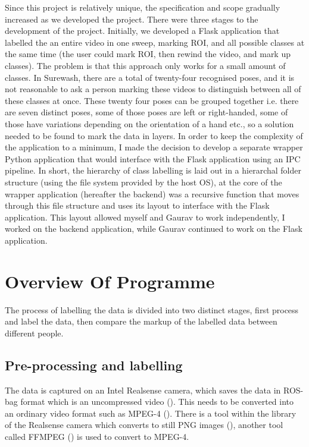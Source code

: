 Since this project is relatively unique, the specification and scope gradually increased as we developed the project. There were three stages to the development of the project. Initially, we developed a Flask application that labelled the an entire video in one sweep, marking ROI, and all possible classes at the same time (the user could mark ROI, then rewind the video, and mark up classes). The problem is that this approach only works for a small amount of classes. In Surewash, there are a total of twenty-four recognised poses, and it is not reasonable to ask a person marking these videos to distinguish between all of these classes at once. These twenty four poses can be grouped together i.e. there are seven distinct poses, some of those poses are left or right-handed, some of those have variations depending on the orientation of a hand etc., so a solution needed to be found to mark the data in layers. In order to keep the complexity of the application to a minimum, I made the decision to develop a separate wrapper Python application that would interface with the Flask application using an IPC pipeline. In short, the hierarchy of class labelling is laid out in a hierarchal folder structure (using the file system provided by the host OS), at the core of the wrapper application (hereafter the backend) was a recursive function that moves through this file structure and uses its layout to interface with the Flask application. This layout allowed myself and Gaurav to work independently, I worked on the backend application, while Gaurav continued to work on the Flask application.

\section{Overview Of Programme}
The process of labelling the data is divided into two distinct stages, first process and label the data, then compare the markup of the labelled data between different people.
    \subsection{Pre-processing and labelling}
    The data is captured on an Intel Realsense camera, which saves the data in ROS-bag format which is an uncompressed video (\cite{intelrosbag}). This needs to be converted into an ordinary video format such as MPEG-4 (\cite{wiegand2003overview}). There is a tool within the library of the Realsense camera which converts to still PNG images (\cite{boutell1997rfc}), another tool called FFMPEG (\cite{ffmpeg}) is used to convert to MPEG-4. 
    
